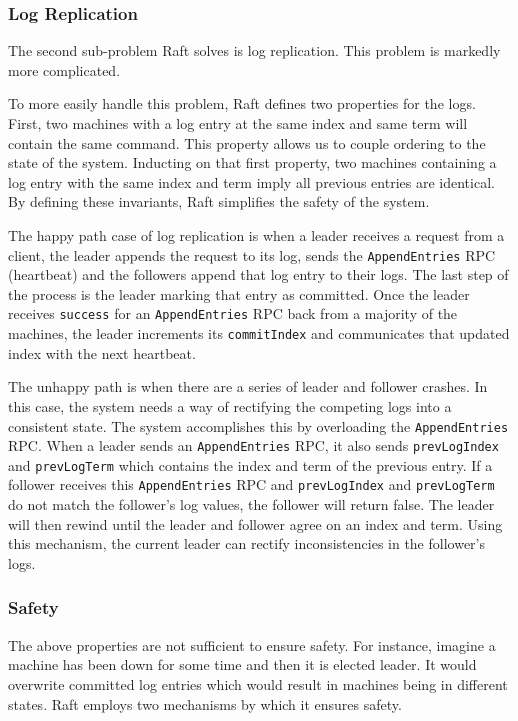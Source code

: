 \subsubsection{Log Replication}

The second sub-problem Raft solves is log replication.
This problem is markedly more complicated.

To more easily handle this problem, Raft defines two properties for the logs.
First, two machines with a log entry at the same index and same term will contain the same command.
This property allows us to couple ordering to the state of the system.
Inducting on that first property, two machines containing a log entry with the same index and term imply all previous entries are identical.
By defining these invariants, Raft simplifies the safety of the system.

The happy path case of log replication is when a leader receives a request from a client, the leader appends the request to its log, sends the \texttt{AppendEntries} RPC (heartbeat) and the followers append that log entry to their logs.
The last step of the process is the leader marking that entry as committed.
Once the leader receives \texttt{success} for an \texttt{AppendEntries} RPC back from a majority of the machines, the leader increments its \texttt{commitIndex} and communicates that updated index with the next heartbeat.

The unhappy path is when there are a series of leader and follower crashes.
In this case, the system needs a way of rectifying the competing logs into a consistent state.
The system accomplishes this by overloading the \texttt{AppendEntries} RPC.
When a leader sends an \texttt{AppendEntries} RPC, it also sends \texttt{prevLogIndex} and \texttt{prevLogTerm} which contains the index and term of the previous entry.
If a follower receives this \texttt{AppendEntries} RPC and \texttt{prevLogIndex} and \texttt{prevLogTerm} do not match the follower's log values, the follower will return false.
The leader will then rewind until the leader and follower agree on an index and term.
Using this mechanism, the current leader can rectify inconsistencies in the follower's logs.


\subsubsection{Safety}

The above properties are not sufficient to ensure safety.
For instance, imagine a machine has been down for some time and then it is elected leader.
It would overwrite committed log entries which would result in machines being in different states.
Raft employs two mechanisms by which it ensures safety.

